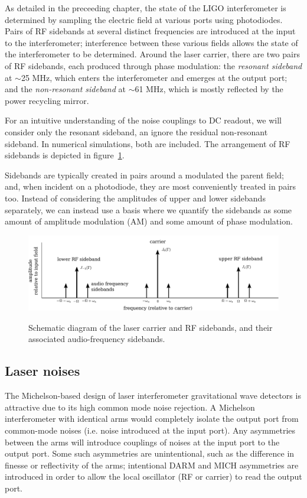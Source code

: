 As detailed in the preceeding chapter, the state of the LIGO interferometer is
determined by sampling the electric field at various ports using photodiodes.
Pairs of RF sidebands at several distinct frequencies are introduced at the
input to the interferometer; interference between these various fields allows
the state of the interferometer to be determined.  Around the laser carrier,
there are two pairs of RF sidebands, each produced through phase modulation: the
\emph{resonant sideband} at $\sim$25 MHz, which enters the interferometer and
emerges at the output port; and the \emph{non-resonant sideband} at $\sim$61
MHz, which is mostly reflected by the power recycling mirror.

For an intuitive understanding of the noise couplings to DC readout, we will
consider only the resonant sideband, an ignore the residual non-resonant
sideband.  In numerical simulations, both are included.  The arrangement of RF
sidebands is depicted in figure~\ref{fig:af-sidebands}.

Sidebands are typically created in pairs around a modulated the parent field;
and, when incident on a photodiode, they are most conveniently treated in pairs
too.  Instead of considering the amplitudes of upper and lower sidebands
separately, we can instead use a basis where we quantify the sidebands as some
amount of amplitude modulation (AM) and some amount of phase modulation.

\begin{figure}[]
\includegraphics[width=\columnwidth]{figures/af_sidebands.pdf}
\label{fig:af-sidebands}
\caption[Radio- and audio-frequency sidebands]{Schematic diagram of the laser carrier and RF sidebands, and their
  associated audio-frequency sidebands.}
\end{figure}

\subsection{Laser noises}

The Michelson-based design of laser interferometer gravitational wave detectors
is attractive due to its high common mode noise rejection.  A Michelson
interferometer with identical arms would completely isolate the output port from
common-mode noises (i.e. noise introduced at the input port).  Any asymmetries
between the arms will introduce couplings of noises at the input port to the
output port.  Some such asymmetries are unintentional, such as the difference in
finesse or reflectivity of the arms; intentional DARM and MICH asymmetries are
introduced in order to allow the local oscillator (RF or carrier) to read the
output port.

